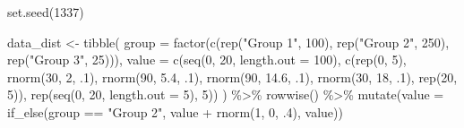 \documentclass[
  letterpaper,
]{book}
\newenvironment{Shaded}{\begin{snugshade}}{\end{snugshade}}
\newcommand{\AttributeTok}[1]{\textcolor[rgb]{0.40,0.45,0.13}{#1}}
\newcommand{\DecValTok}[1]{\textcolor[rgb]{0.68,0.00,0.00}{#1}}
\newcommand{\FloatTok}[1]{\textcolor[rgb]{0.68,0.00,0.00}{#1}}
\newcommand{\FunctionTok}[1]{\textcolor[rgb]{0.28,0.35,0.67}{#1}}
\newcommand{\NormalTok}[1]{\textcolor[rgb]{0.00,0.23,0.31}{#1}}
\newcommand{\OtherTok}[1]{\textcolor[rgb]{0.00,0.23,0.31}{#1}}
\newcommand{\SpecialCharTok}[1]{\textcolor[rgb]{0.37,0.37,0.37}{#1}}
\newcommand{\StringTok}[1]{\textcolor[rgb]{0.13,0.47,0.30}{#1}}
\begin{document}
\begin{Shaded}
\begin{Highlighting}[]
\FunctionTok{set.seed}\NormalTok{(}\DecValTok{1337}\NormalTok{)}

\NormalTok{data\_dist }\OtherTok{\textless{}{-}} \FunctionTok{tibble}\NormalTok{(}
  \AttributeTok{group =} \FunctionTok{factor}\NormalTok{(}\FunctionTok{c}\NormalTok{(}\FunctionTok{rep}\NormalTok{(}\StringTok{"Group 1"}\NormalTok{, }\DecValTok{100}\NormalTok{), }\FunctionTok{rep}\NormalTok{(}\StringTok{"Group 2"}\NormalTok{, }\DecValTok{250}\NormalTok{), }\FunctionTok{rep}\NormalTok{(}\StringTok{"Group 3"}\NormalTok{, }\DecValTok{25}\NormalTok{))),}
  \AttributeTok{value =} \FunctionTok{c}\NormalTok{(}\FunctionTok{seq}\NormalTok{(}\DecValTok{0}\NormalTok{, }\DecValTok{20}\NormalTok{, }\AttributeTok{length.out =} \DecValTok{100}\NormalTok{),}
            \FunctionTok{c}\NormalTok{(}\FunctionTok{rep}\NormalTok{(}\DecValTok{0}\NormalTok{, }\DecValTok{5}\NormalTok{), }\FunctionTok{rnorm}\NormalTok{(}\DecValTok{30}\NormalTok{, }\DecValTok{2}\NormalTok{, .}\DecValTok{1}\NormalTok{), }\FunctionTok{rnorm}\NormalTok{(}\DecValTok{90}\NormalTok{, }\FloatTok{5.4}\NormalTok{, .}\DecValTok{1}\NormalTok{), }\FunctionTok{rnorm}\NormalTok{(}\DecValTok{90}\NormalTok{, }\FloatTok{14.6}\NormalTok{, .}\DecValTok{1}\NormalTok{), }\FunctionTok{rnorm}\NormalTok{(}\DecValTok{30}\NormalTok{, }\DecValTok{18}\NormalTok{, .}\DecValTok{1}\NormalTok{), }\FunctionTok{rep}\NormalTok{(}\DecValTok{20}\NormalTok{, }\DecValTok{5}\NormalTok{)),}
            \FunctionTok{rep}\NormalTok{(}\FunctionTok{seq}\NormalTok{(}\DecValTok{0}\NormalTok{, }\DecValTok{20}\NormalTok{, }\AttributeTok{length.out =} \DecValTok{5}\NormalTok{), }\DecValTok{5}\NormalTok{))}
\NormalTok{  ) }\SpecialCharTok{\%\textgreater{}\%} 
  \FunctionTok{rowwise}\NormalTok{() }\SpecialCharTok{\%\textgreater{}\%}
  \FunctionTok{mutate}\NormalTok{(}\AttributeTok{value =} \FunctionTok{if\_else}\NormalTok{(group }\SpecialCharTok{==} \StringTok{"Group 2"}\NormalTok{, value }\SpecialCharTok{+} \FunctionTok{rnorm}\NormalTok{(}\DecValTok{1}\NormalTok{, }\DecValTok{0}\NormalTok{, .}\DecValTok{4}\NormalTok{), value))}
\end{Highlighting}
\end{Shaded}
\end{document}
